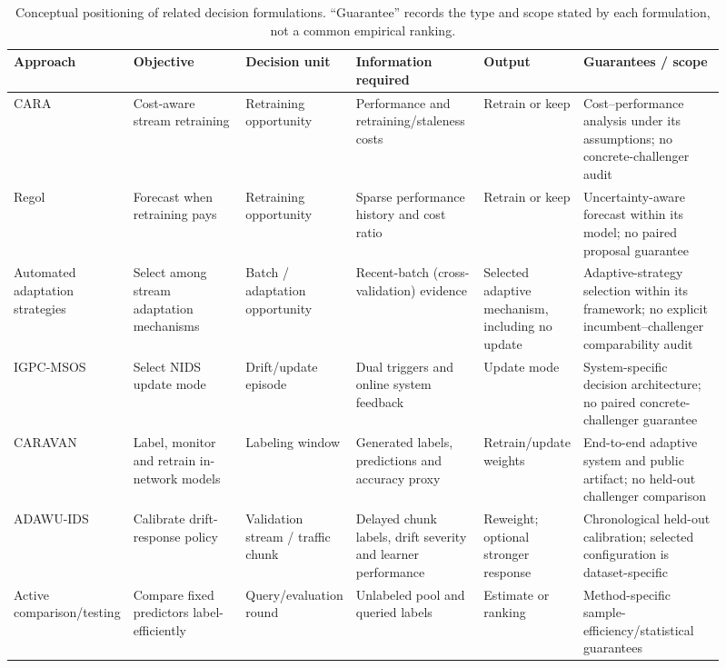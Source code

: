 \documentclass[journal]{IEEEtran}
\begin{document}
\begin{table}[t]
\centering
\caption{Conceptual positioning of related decision formulations. ``Guarantee'' records the type and scope stated by each formulation, not a common empirical ranking.}
\label{tab:positioning}
\scriptsize
\setlength{\tabcolsep}{2pt}
\renewcommand{\arraystretch}{1.12}
\begin{tabular}{p{0.12\linewidth} p{0.16\linewidth} p{0.12\linewidth} p{0.18\linewidth} p{0.13\linewidth} p{0.20\linewidth}}
\toprule
Approach & Objective & Decision unit & Information required & Output & Guarantees / scope \\
\midrule
CARA \cite{mahadevan2024cost} & Cost-aware stream retraining & Retraining opportunity & Performance and retraining/staleness costs & Retrain or keep & Cost--performance analysis under its assumptions; no concrete-challenger audit \\
Regol \cite{regol2025retrain} & Forecast when retraining pays & Retraining opportunity & Sparse performance history and cost ratio & Retrain or keep & Uncertainty-aware forecast within its model; no paired proposal guarantee \\
Automated adaptation strategies \cite{bakirov2021automated} & Select among stream adaptation mechanisms & Batch / adaptation opportunity & Recent-batch (cross-validation) evidence & Selected adaptive mechanism, including no update & Adaptive-strategy selection within its framework; no explicit incumbent--challenger comparability audit \\
IGPC-MSOS \cite{shyaa2026igpcmsos} & Select NIDS update mode & Drift/update episode & Dual triggers and online system feedback & Update mode & System-specific decision architecture; no paired concrete-challenger guarantee \\
CARAVAN \cite{zhang2024caravan} & Label, monitor and retrain in-network models & Labeling window & Generated labels, predictions and accuracy proxy & Retrain/update weights & End-to-end adaptive system and public artifact; no held-out challenger comparison \\
ADAWU-IDS \cite{yuan2026adawu} & Calibrate drift-response policy & Validation stream / traffic chunk & Delayed chunk labels, drift severity and learner performance & Reweight; optional stronger response & Chronological held-out calibration; selected configuration is dataset-specific \\
Active comparison/testing \cite{sawade2012active,kossen2021active} & Compare fixed predictors label-efficiently & Query/evaluation round & Unlabeled pool and queried labels & Estimate or ranking & Method-specific sample-efficiency/statistical guarantees \\

\end{tabular}
\end{table}
\end{document}
